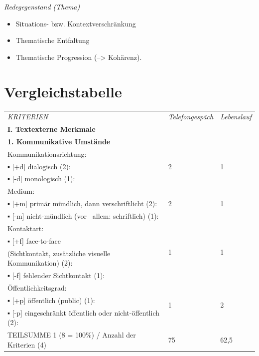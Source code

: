 \documentclass[
  letterpaper,
]{scrbook}
\providecommand{\tightlist}{%
  \setlength{\itemsep}{0pt}\setlength{\parskip}{0pt}}\usepackage{longtable,booktabs,array}
\begin{document}
\emph{Redegegenstand (Thema)}

\begin{itemize}
\tightlist
\item
  Situations- bzw. Kontextverschränkung\\
\item
  Thematische Entfaltung
\item
  Thematische Progression (--\textgreater{} Kohärenz).
\end{itemize}

\hypertarget{vergleichstabelle}{%
\section{Vergleichstabelle}\label{vergleichstabelle}}

\begin{longtable}[]{@{}lll@{}}
\toprule()
\endhead
\emph{{KRITERIEN}} & {\emph{{Telefongespäch}}}\emph{{}} &
{\emph{{Lebenslauf}}}\emph{{}} \\
\textbf{{I. {Textexterne} {Merkmale}}} & {~} & {~} \\
\textbf{{1. {Kommunikative} {Umstände}}} & {~} & {~} \\
{{Kommunikationsrichtung}}{:} & \multirow{3}{*}{{2}} &
\multirow{3}{*}{{1}} \\
{▪ {[}+d{]} {dialogisch} (2):} \\
{▪ {[}-d{]} {monologisch} (1):} \\
{{Medium}}{:} & \multirow{3}{*}{{2}} & \multirow{3}{*}{{1}} \\
{▪ {[}+m{]} {primär} {mündlich}, {dann} {verschriftlicht} (2):} \\
{▪ {[}-m{]} {nicht-mündlich} ({vor}{~ }{allem}: {schriftlich}) (1): } \\
{{Kontaktart}}{:} & \multirow{4}{*}{{1}} & \multirow{4}{*}{{1}} \\
{▪ {[}+f{]} face-to-face} \\
{({Sichtkontakt}, {zusätzliche} {visuelle} {Kommunikation}) (2): } \\
{▪ {[}-f{]} {fehlender} {Sichtkontakt} (1):} \\
{{Öffentlichkeitsgrad}}{:} & \multirow{3}{*}{{1}} &
\multirow{3}{*}{{2}} \\
{▪ {[}+p{]} {öffentlich} ({public}) (1): } \\
{▪ {[}-p{]} {eingeschränkt} {öffentlich} oder {nicht-öffentlich} (2):
} \\
{TEILSUMME 1 (8 = 100\%) / {Anzahl} der {Kriterien} (4)} & {75} &
{62,5} \\

\end{longtable}
\end{document}
